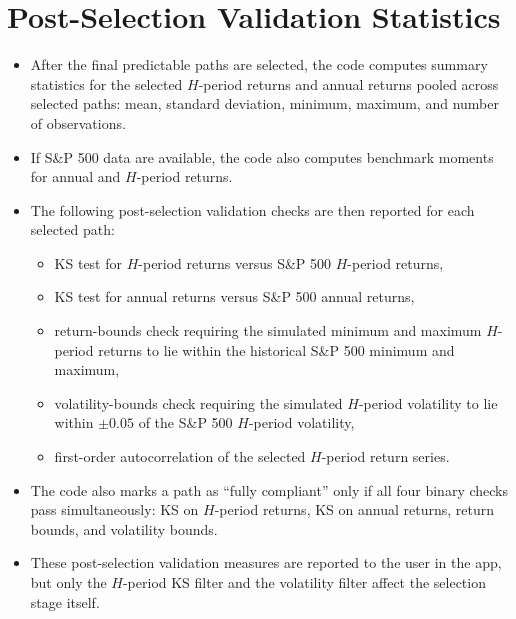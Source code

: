 \documentclass[11pt]{article}
\begin{document}
\section*{Post-Selection Validation Statistics}
\begin{itemize}
\item After the final predictable paths are selected, the code computes summary statistics for the selected \(H\)-period returns and annual returns pooled across selected paths: mean, standard deviation, minimum, maximum, and number of observations.
\item If S\&P 500 data are available, the code also computes benchmark moments for annual and \(H\)-period returns.
\item The following post-selection validation checks are then reported for each selected path:
\begin{itemize}
\item KS test for \(H\)-period returns versus S\&P 500 \(H\)-period returns,
\item KS test for annual returns versus S\&P 500 annual returns,
\item return-bounds check requiring the simulated minimum and maximum \(H\)-period returns to lie within the historical S\&P 500 minimum and maximum,
\item volatility-bounds check requiring the simulated \(H\)-period volatility to lie within \(\pm 0.05\) of the S\&P 500 \(H\)-period volatility,
\item first-order autocorrelation of the selected \(H\)-period return series.
\end{itemize}
\item The code also marks a path as ``fully compliant'' only if all four binary checks pass simultaneously: KS on \(H\)-period returns, KS on annual returns, return bounds, and volatility bounds.
\item These post-selection validation measures are reported to the user in the app, but only the \(H\)-period KS filter and the volatility filter affect the selection stage itself.
\end{itemize}
\end{document}
